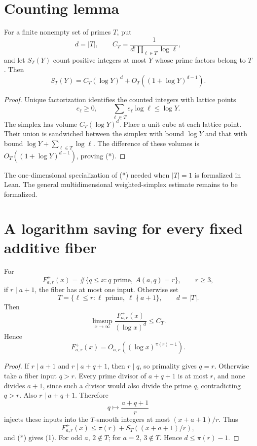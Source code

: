 \documentclass[10pt,a4paper]{scrartcl}
\begin{document}
\section{Counting lemma}

For a finite nonempty set of primes $T$, put
\[
d=|T|,\qquad C_T=\frac1{d!\prod_{\ell\in T}\log\ell},
\]
and let $S_T(Y)$ count positive integers at most $Y$ whose prime factors belong to $T$. Then
\begin{equation}
S_T(Y)=C_T(\log Y)^d+O_T((1+\log Y)^{d-1}). \tag{*}
\end{equation}

\begin{proof}
Unique factorization identifies the counted integers with lattice points
\[
e_\ell\ge0,\qquad \sum_{\ell\in T}e_\ell\log\ell\le\log Y.
\]
The simplex has volume $C_T(\log Y)^d$. Place a unit cube at each lattice point. Their union is sandwiched between the simplex with bound $\log Y$ and that with bound $\log Y+\sum_{\ell\in T}\log\ell$. The difference of these volumes is $O_T((1+\log Y)^{d-1})$, proving (*).
\end{proof}

The one-dimensional specialization of (*) needed when $|T|=1$ is formalized in Lean. The general multidimensional weighted-simplex estimate remains to be formalized.

\section{A logarithm saving for every fixed additive fiber}

For
\[
F^+_{a,r}(x)=\#\{q\le x:q\text{ prime},\ A(a,q)=r\},\qquad r\ge3,
\]
if $r\mid a+1$, the fiber has at most one input. Otherwise set
\[
T=\{\ell\le r:\ell\text{ prime},\ \ell\nmid a+1\},\qquad d=|T|.
\]
Then
\begin{equation}
\limsup_{x\to\infty}\frac{F^+_{a,r}(x)}{(\log x)^d}\le C_T. \tag{1}
\end{equation}
Hence
\[
F^+_{a,r}(x)=O_{a,r}((\log x)^{\pi(r)-1}).
\]

\begin{proof}
If $r\mid a+1$ and $r\mid a+q+1$, then $r\mid q$, so primality gives $q=r$. Otherwise take a fiber input $q>r$. Every prime divisor of $a+q+1$ is at most $r$, and none divides $a+1$, since such a divisor would also divide the prime $q$, contradicting $q>r$. Also $r\mid a+q+1$. Therefore
\[
q\mapsto \frac{a+q+1}{r}
\]
injects these inputs into the $T$-smooth integers at most $(x+a+1)/r$. Thus
\[
F^+_{a,r}(x)\le \pi(r)+S_T((x+a+1)/r),
\]
and (*) gives (1). For odd $a$, $2\notin T$; for $a=2$, $3\notin T$. Hence $d\le\pi(r)-1$.
\end{proof}
\end{document}
